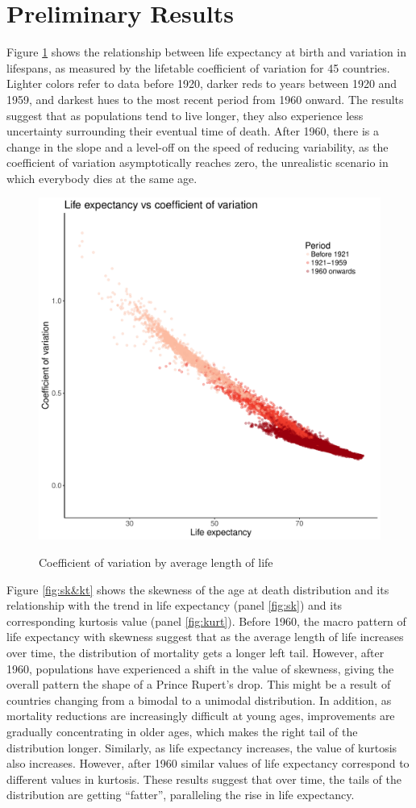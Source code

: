 \documentclass{article}
\begin{document}
\FloatBarrier
\section*{Preliminary Results}
Figure \ref{fig:CV} shows the relationship between life expectancy at birth and 
variation in lifespans, as measured by the lifetable coefficient of variation
for 45 countries. Lighter colors refer to data before 1920, darker reds to years between 1920 and 1959, and darkest hues to the most recent period from 1960 onward. The results suggest that as populations tend to live longer, they also experience less uncertainty surrounding their eventual time of death. After 1960, there is a change in the slope and a level-off on the speed of reducing variability, as the coefficient of variation asymptotically reaches zero, the unrealistic scenario in which everybody dies at the same age.
\begin{figure}
\caption{Coefficient of variation by average length of life}
\centering
\includegraphics[width=.3\textwidth]{Figures/Figure_CV}
\label{fig:CV}
\end{figure}

Figure \ref{fig:sk&kt} shows the skewness of the age at death distribution and
its relationship with the trend in life expectancy (panel \ref{fig:sk}) and
its corresponding kurtosis value (panel \ref{fig:kurt}). Before 1960, the macro
pattern of life expectancy with skewness suggest that as the average length of
life increases over time, the distribution of mortality gets a longer left tail.
However, after 1960, populations have experienced a shift in the value
of skewness, giving the overall pattern the shape of a Prince Rupert's drop. This
might be a result of countries changing from a bimodal to a unimodal
distribution. In addition, as mortality reductions are increasingly difficult at
young ages, improvements are gradually concentrating in older ages, which makes
the right tail of the distribution longer. Similarly, as life expectancy increases, the value of kurtosis also increases. However, after 1960 similar values of life expectancy correspond to different values in kurtosis. These results suggest that over time, the tails of the distribution are getting ``fatter'', paralleling the rise in life expectancy.
\end{document}
